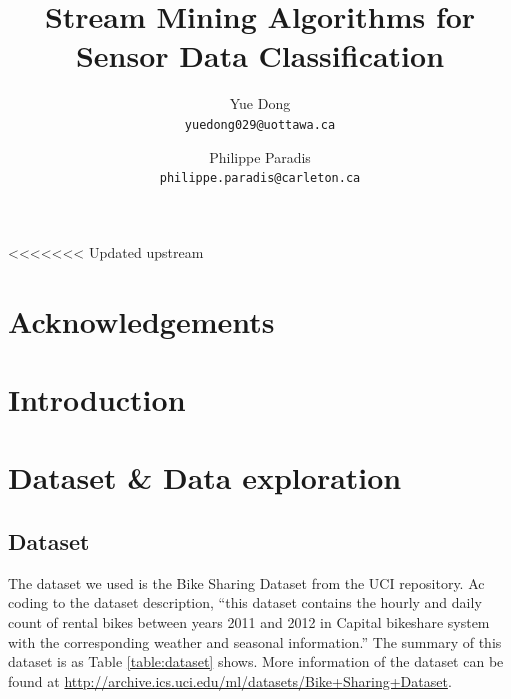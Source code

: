 \documentclass[12pt]{article}
\title{Stream Mining Algorithms for Sensor Data Classification}
\author{
	Yue Dong\\
	\texttt{yuedong029@uottawa.ca}
	\and
	Philippe Paradis\\
	\texttt{philippe.paradis@carleton.ca}
}
\begin{document}
<<<<<<< Updated upstream
\singlespace
\maketitle

\tableofcontents
\newpage
\section*{Acknowledgements}


\begin{abstract}                %


\end{abstract}

\setcounter{secnumdepth}{4}

\section{Introduction}
\label{sec:introduction}

\section{Dataset \& Data exploration}
\subsection{Dataset}
The dataset we used is the Bike Sharing Dataset from the UCI repository. Ac coding to the dataset description, ``this dataset contains the hourly and daily count of rental bikes between years 2011 and 2012 in Capital bikeshare system with the corresponding weather and seasonal information.''
 The summary of this dataset is as Table \ref{table:dataset} shows. More information of the dataset can be found at \url{http://archive.ics.uci.edu/ml/datasets/Bike+Sharing+Dataset}.
 
\end{document}
